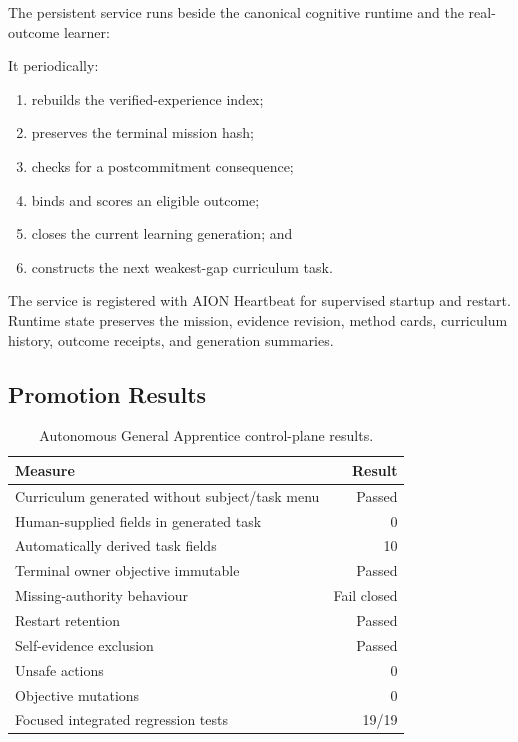 The persistent service runs beside the canonical cognitive runtime and the
real-outcome learner:
\begin{center}
\small{}
\end{center}
It periodically:
\begin{enumerate}
    \item rebuilds the verified-experience index;
    \item preserves the terminal mission hash;
    \item checks for a postcommitment consequence;
    \item binds and scores an eligible outcome;
    \item closes the current learning generation; and
    \item constructs the next weakest-gap curriculum task.
\end{enumerate}
The service is registered with AION Heartbeat for supervised startup and
restart.  Runtime state preserves the mission, evidence revision, method cards,
curriculum history, outcome receipts, and generation summaries.

\subsection{Promotion Results}
\label{subsec:general-apprentice-results}

\begin{table}[htbp]
\centering
\caption{Autonomous General Apprentice control-plane results.}
\label{tab:general-apprentice-results}
\begin{tabular}{@{}lr@{}}
\toprule
Measure & Result \\
\midrule
Curriculum generated without subject/task menu & Passed \\
Human-supplied fields in generated task & 0 \\
Automatically derived task fields & 10 \\
Terminal owner objective immutable & Passed \\
Missing-authority behaviour & Fail closed \\
Restart retention & Passed \\
Self-evidence exclusion & Passed \\
Unsafe actions & 0 \\
Objective mutations & 0 \\
Focused integrated regression tests & 19/19 \\
\bottomrule
\end{tabular}
\end{table}

